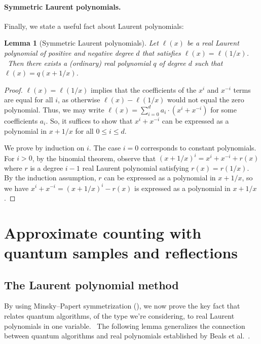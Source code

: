 \documentclass[10pt,a4paper]{article}
\newtheorem{lemma}[theorem]{Lemma}
\newcommand{\<}{\langle}
\renewcommand{\>}{\rangle}
\newcommand{\para}[1]{\paragraph{#1}}
\begin{document}
\para{Symmetric Laurent polynomials.}
Finally, we state a useful fact about Laurent polynomials:

\begin{lemma}[Symmetric Laurent polynomials]
\label{lem:symmetric} Let $\ell (x)$ be a real Laurent polynomial of positive
and negative degree $d$ that satisfies $\ell (x)=\ell (1/x)$. \ Then there exists a (ordinary) real
polynomial $q$ of degree $d$ such that $\ell (x)=q(x+1/x)$.
\end{lemma}

\begin{proof}
$\ell(x) = \ell(1/x)$ implies that the coefficients of the $x^i$ and $x^{-i}$ terms are equal for all $i$, as otherwise $\ell(x) - \ell(1/x)$ would not equal the zero polynomial. Thus, we may write $\ell(x) = \sum_{i=0}^d a_i \cdot (x^i + x^{-i})$ for some coefficients $a_i$. So, it suffices to show that $x^i + x^{-i}$ can be expressed as a polynomial in $x + 1/x$ for all $0 \le i \le d$.

We prove by induction on $i$. The case $i = 0$ corresponds to constant polynomials. For $i > 0$, by the binomial theorem, observe that $(x + 1/x)^i = x^i + x^{-i} + r(x)$ where $r$ is a degree $i - 1$ real Laurent polynomial satisfying $r(x) = r(1/x)$. By the induction assumption, $r$ can be expressed as a polynomial in $x + 1/x$, so we have $x^i + x^{-i} = (x + 1/x)^i - r(x)$ is expressed as a polynomial in $x + 1/x$.
\end{proof}

%

\setcounter{section}{3}
\setcounter{theorem}{20}
\section{Approximate counting with quantum samples and reflections}

\label{sec:samplesreflections}

%
\subsection{The Laurent polynomial method}

\label{RESULT}\label{sec:lower}\label{sec:Laurent}

By using Minsky--Papert symmetrization (), we now prove the key
fact that relates quantum algorithms, of the type we're considering, to real
Laurent polynomials in one variable. \ The following lemma generalizes the
connection between quantum algorithms and real polynomials established by
Beals et al.\ \cite{bbcmw}.
\end{document}
